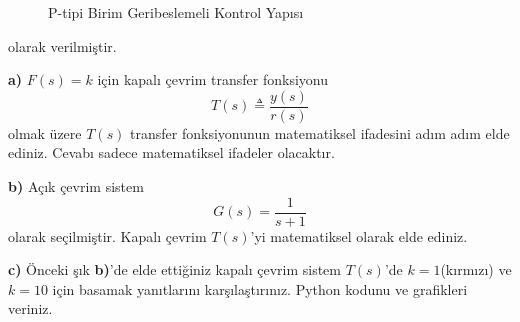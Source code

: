 \begin{figure}[!h]
	\centering
	\caption{P-tipi Birim Geribeslemeli Kontrol Yapısı}
	\label{fig:PTipiKontrolBlokDiyagrami}
\end{figure}
olarak verilmiştir.

\noindent\textbf{a)} $F(s)=k$ için kapalı çevrim transfer fonksiyonu
\begin{equation*}
	T(s)\triangleq \frac{y(s)}{r(s)}
\end{equation*}
olmak üzere $T(s)$ transfer fonksiyonunun matematiksel ifadesini adım adım elde ediniz. Cevabı sadece matematiksel ifadeler olacaktır.

\noindent\textbf{b)} Açık çevrim sistem
\begin{equation}
	G(s)=\frac{1}{s+1}
\end{equation}
olarak seçilmiştir. Kapalı çevrim $T(s)$'yi matematiksel olarak elde ediniz.

\noindent\textbf{c)} Önceki şık \noindent\textbf{b)}'de elde ettiğiniz kapalı çevrim sistem $T(s)$'de $k=1$(kırmızı) ve $k=10$ için basamak yanıtlarını karşılaştırınız. Python kodunu ve grafikleri veriniz.
